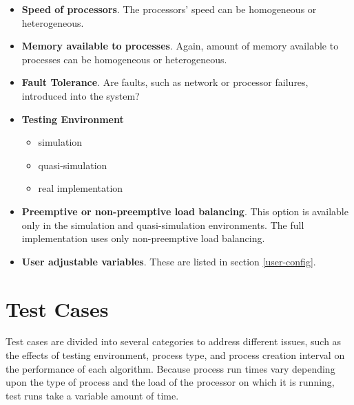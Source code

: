 \documentclass{report}
\begin{document}
\begin{itemize}
	\item \textbf{Speed of processors}.  The processors' speed can be
	homogeneous or heterogeneous.

	\item \textbf{Memory available to processes}.  Again, amount of
	memory available to processes can be homogeneous or heterogeneous.

	\item \textbf{Fault Tolerance}.  Are faults, such as network or
	processor failures, introduced into the system?

	\item \textbf{Testing Environment}
	\begin{itemize}
		\item simulation
		\item quasi-simulation
		\item real implementation
	\end{itemize}

	\item \textbf{Preemptive or non-preemptive load balancing}.  This
		option is available only in the simulation and
		quasi-simulation environments.  The full implementation uses
		only non-preemptive load balancing.

	\item \textbf{User adjustable variables}.  These are listed in
		section \ref{user-config}.
\end{itemize}

\section{Test Cases}
\label{test_cases}

Test cases are divided into several categories to address different issues,
such as the effects of testing environment, process type, and process
creation interval on the performance of each algorithm.  Because process run
times vary depending upon the type of process and the load of the processor
on which it is running, test runs take a variable amount of time.
\end{document}
